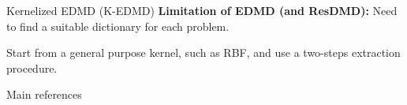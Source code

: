 \documentclass{beamer}
\begin{document}
\begin{frame}{Kernelized EDMD (K-EDMD)}
\alert{\textbf{Limitation of EDMD (and ResDMD):}} Need to find a suitable dictionary for each problem.

\medskip
{} Start from a general purpose kernel, such as RBF, and use a two-steps extraction procedure.


\end{frame}
\begin{frame}{Main references}
\nocite{*}
\printbibliography
\end{frame}
\end{document}
